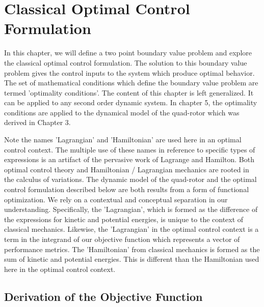 
\chapter{Classical Optimal Control Formulation} %

\label{Chapter4} %


In this chapter, we will define a two point boundary value problem and explore the classical optimal control formulation. The solution to this boundary value problem gives the control inputs to the system which produce optimal behavior. The set of mathematical conditions which define the boundary value problem are termed 'optimality conditions'. The content of this chapter is left generalized. It can be applied to any second order dynamic system. In chapter 5, the optimality conditions are applied to the dynamical model of the quad-rotor which was derived in Chapter 3.

Note the names 'Lagrangian' and 'Hamiltonian' are used here in an optimal control context. The multiple use of these names in reference to specific types of expressions is an artifact of the pervasive work of Lagrange and Hamilton. Both optimal control theory and Hamiltonian / Lagrangian mechanics are rooted in the calculus of variations. The dynamic model of the quad-rotor and the optimal control formulation described below are both results from a form of functional optimization. We rely on a contextual and conceptual separation in our understanding. Specifically, the 'Lagrangian', which is formed as the difference of the expressions for kinetic and potential energies, is unique to the context of classical mechanics. Likewise, the 'Lagrangian' in the optimal control context is a term in the integrand of our objective function which represents a vector of performance metrics. The 'Hamiltonian' from classical mechanics is formed as the sum of kinetic and potential energies. This is different than the Hamiltonian used here in the optimal control context.

\section{Derivation of the Objective Function}

